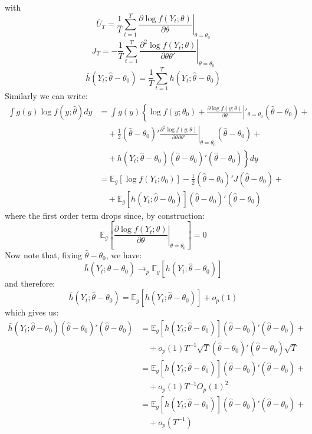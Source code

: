with
\[
\bar{U}_T=\frac{1}{T}\sum_{t=1}^{T}\left.\frac{\partial\log f(Y_t;\theta)}{\partial\theta}\right|_{\theta=\theta_0}
\]
\[
J_T=-\frac{1}{T}\sum_{t=1}^{T}\left.\frac{\partial^2\log f(Y_t;\theta)}{\partial\theta\theta'}\right|_{\theta=\theta_0}
\] 
\[
\bar{h}(Y_t;\hat{\theta}-\theta_0)=\frac{1}{T}\sum_{t=1}^{T}h(Y_t;\hat{\theta}-\theta_0)
\]
Similarly we can write:
\begin{align*}
\int g(y)\log f(y;\widehat{\theta})dy & =  \int g(y)\left\{\log f(y;\theta_0)+\left.\frac{\partial\log f(y;\theta)}{\partial\theta}\right|'_{\theta=\theta_0}(\widehat{\theta}-\theta_0) + \right. \\ & \left. \quad +\frac{1}{2}(\widehat{\theta}-\theta_0)' \left.\frac{\partial^2\log f(y;\theta)}{\partial\theta\partial\theta'}\right|_{\theta=\theta_0} (\widehat{\theta}-\theta_0) + \right. \\
&\left. \quad+h(Y_t;\hat{\theta}-\theta_0)(\widehat{\theta}-\theta_0)'(\widehat{\theta}-\theta_0) \right\}dy \\
& = \mathbb{E}_g \left[\log f(Y_t;\theta_0) \right] - \frac{1}{2} (\widehat{\theta}-\theta_0)'  J  (\widehat{\theta}-\theta_0) + \\
& \quad + \mathbb{E}_g \left[ h(Y_t;\hat{\theta}-\theta_0) \right] (\widehat{\theta}-\theta_0)'(\widehat{\theta}-\theta_0)
\end{align*}
where the first order term drops since, by construction:
\[
\mathbb{E}_g \left[\left.\frac{\partial\log f(Y_t;\theta)}{\partial\theta}\right|_{\theta=\theta_0}\right]=0
\]
Now note that, fixing $\widehat{\theta}-\theta_0$, we have:
\[
\bar{h}(Y_t;\hat{\theta}-\theta_0) \longrightarrow_p \mathbb{E}_g \left[ h(Y_t;\hat{\theta}-\theta_0) \right] 
\]
and therefore:
\[
\bar{h}(Y_t;\hat{\theta}-\theta_0)=\mathbb{E}_g \left[ h(Y_t;\hat{\theta}-\theta_0) \right] +o_p(1)
\]
which gives us:
\begin{align*}
\bar{h}(Y_t;\hat{\theta}-\theta_0)(\widehat{\theta}-\theta_0)'(\widehat{\theta}-\theta_0)&= \mathbb{E}_g \left[ h(Y_t;\hat{\theta}-\theta_0) \right] (\widehat{\theta}-\theta_0)'  (\widehat{\theta}-\theta_0) + \\
& \quad +o_p\left(1\right)T^{-1}\sqrt{T} (\widehat{\theta}-\theta_0)' (\widehat{\theta}-\theta_0)\sqrt{T} \\
&= \mathbb{E}_g \left[ h(Y_t;\hat{\theta}-\theta_0) \right] (\widehat{\theta}-\theta_0)' (\widehat{\theta}-\theta_0) + \\
&\quad+o_p\left(1\right)T^{-1}O_p\left(1\right)^2\\
&= \mathbb{E}_g \left[ h(Y_t;\hat{\theta}-\theta_0) \right] (\widehat{\theta}-\theta_0)' (\widehat{\theta}-\theta_0) + \\
&\quad+o_p\left(T^{-1}\right)
\end{align*}
